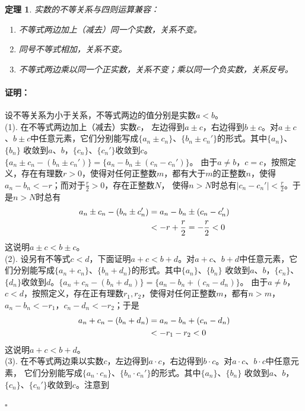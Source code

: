 \documentclass[12pt,UTF8]{ctexbook}
\newtheorem{tm}{定理}[section]
\renewenvironment{proof}{\paragraph{\textbf{证明：}}}{\hfill$\square$}
\begin{document}
\begin{appendix}
\begin{tm}\label{tm:a-1-30}
    实数的不等关系与四则运算兼容：
    \begin{enumerate}
        \item 不等式两边加上（减去）同一个实数，关系不变。
        \item 同号不等式相加，关系不变。
        \item 不等式两边乘以同一个正实数，关系不变；乘以同一个负实数，关系反号。
    \end{enumerate}
\end{tm}
\begin{proof}
    设不等关系为小于关系，不等式两边的值分别是实数$a<b$。\\
    (1). 在不等式两边加上（减去）实数$c$，
    左边得到$a\pm c$，右边得到$b\pm c$。对$a\pm c$、$b\pm c$中任意元素，它们分别能写成$\{a_n\pm c_n\}$、$\{b_n\pm c_n'\}$的形式。其中$\{a_n\}$、$\{b_n\}$
    收敛到$a$、$b$，$\{c_n\}$、$\{c_n'\}$收敛到$c$。$\{a_n\pm c_n-(b_n\pm c_n')\} = \{a_n - b_n \pm  (c_n - c_n')\}$。
    由于$a\neq b$，$c = c$，按照定义，存在有理数$r>0$，使得对任何正整数$m$，都有大于$m$的正整数$n$，使得$a_n - b_n < -r$；而对于$\frac{r}{2}>0$，存在正整数$N$，
    使得$n>N$时总有$|c_n - c_n'| < \frac{r}{2}$。于是$n>N$时总有
    \begin{align}
        a_n\pm c_n-(b_n\pm c_n') &= a_n - b_n \pm  (c_n - c_n') \notag \\
        &< -r + \frac{r}{2} = -\frac{r}{2} < 0 \notag
    \end{align}
    这说明$a\pm c < b\pm c$。\\
    (2). 设另有不等式$c<d$，下面证明$a + c < b + d$。对$a + c$、$b + d$中任意元素，它们分别能写成$\{a_n + c_n\}$、$\{b_n + d_n\}$的形式。其中$\{a_n\}$、$\{b_n\}$
    收敛到$a$、$b$，$\{c_n\}$、$\{d_n\}$收敛到$d$。$\{a_n + c_n-(b_n + d_n)\} = \{a_n - b_n + (c_n - d_n)\}$。
    由于$a\neq b$，$c < d$，按照定义，存在正有理数$r_1,r_2$，使得对任何正整数$m$，都有$n>m$，$a_n - b_n < -r_1$，$c_n - d_n < -r_2$；于是
    \begin{align}
        a_n + c_n-(b_n + d_n) &= a_n - b_n +  (c_n - d_n) \notag \\
        &< -r_1 - r_2 < 0 \notag
    \end{align}
    这说明$a + c < b + d$。\\
    (3). 在不等式两边乘以实数$c$，左边得到$a\cdot c$，右边得到$b\cdot c$。对$a\cdot c$、$b\cdot c$中任意元素，
    它们分别能写成$\{a_n\cdot c_n\}$、$\{b_n\cdot c_n'\}$的形式。其中$\{a_n\}$、$\{b_n\}$
    收敛到$a$、$b$，$\{c_n\}$、$\{c_n'\}$收敛到$c$。注意到

\end{proof}
\end{appendix}
\end{document}
